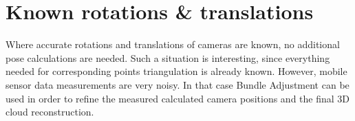 \section{Known rotations \& translations}
Where accurate rotations and translations of cameras are known, no additional pose calculations are needed. Such a situation is interesting, since everything needed for corresponding points triangulation is already known. However, mobile sensor data  measurements are very noisy. In that case Bundle Adjustment can be used in order to refine the measured calculated camera positions and the final 3D cloud reconstruction.



